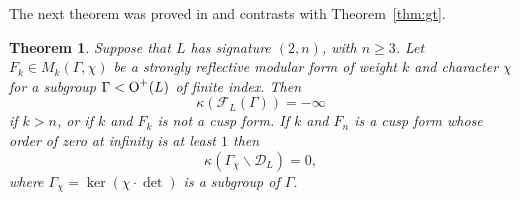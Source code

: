 \documentclass[a4paper,11pt]{article}
\newtheorem{theorem}[lemma]{Theorem}
\renewcommand{\cD}{\mathcal D}
\newcommand{\cF}{\mathcal F}
\newcommand{\Orth}{\mathop{\null\mathrm {O}}\nolimits}
\begin{document}
The next theorem was proved in \cite{G4} and contrasts with
Theorem~\ref{thm:gt}.
\begin{theorem}\label{thm:kdim}
Suppose that $L$ has signature $(2,n)$, with $n\ge 3$. Let $F_k\in
M_k(\Gamma, \chi)$ be a strongly reflective modular form of weight $k$
and character $\chi$ for a subgroup $\Gamma<\Orth^+(L)$ of finite
index. Then
\begin{equation}\label{kappanegative}
\kappa(\cF_L(\Gamma))=-\infty
\end{equation}
if $k>n$, or if $k$ and $F_k$ is not a cusp form.  If $k$ and
$F_n$ is a cusp form whose order of zero at infinity is at least $1$
then
\begin{equation}\label{kappazero}
\kappa(\Gamma_\chi\backslash \cD_L)=0,
\end{equation}
where $\Gamma_\chi=\ker(\chi\cdot \det)$ is a subgroup of $\Gamma$.
\end{theorem}
\end{document}
